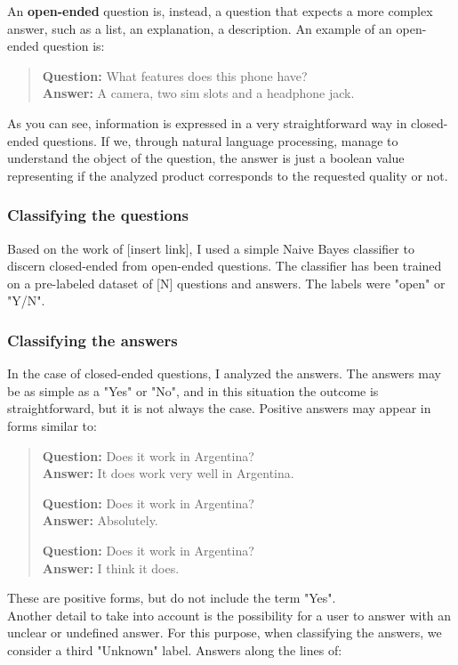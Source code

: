 \documentclass[LaM,binding=0.6cm]{sapthesis}
\begin{document}
An \textbf{open-ended} question is, instead, a question that expects a more complex answer, such as a list, an explanation, a description. An example of an open-ended question is:
\begin{quote}
\textbf{Question:} What features does this phone have? \\
\textbf{Answer:} A camera, two sim slots and a headphone jack.
\end{quote}

As you can see, information is expressed in a very straightforward way in closed-ended questions. If we, through natural language processing, manage to understand the object of the question, the answer is just a boolean value representing if the analyzed product corresponds to the requested quality or not.

\subsubsection{Classifying the questions}
Based on the work of [insert link], I used a simple Naive Bayes classifier to discern closed-ended from open-ended questions.
The classifier has been trained on a pre-labeled dataset of [N] questions and answers. The labels were "open" or "Y/N".

\subsubsection{Classifying the answers}
In the case of closed-ended questions, I analyzed the answers.
The answers may be as simple as a "Yes" or "No", and in this situation the outcome is straightforward, but it is not always the case.
Positive answers may appear in forms similar to:
\begin{quote}
\textbf{Question:} Does it work in Argentina? \\
\textbf{Answer:} It does work very well in Argentina.

\textbf{Question:} Does it work in Argentina? \\
\textbf{Answer:} Absolutely.

\textbf{Question:} Does it work in Argentina? \\
\textbf{Answer:} I think it does.
\end{quote}
These are positive forms, but do not include the term "Yes". \\

Another detail to take into account is the possibility for a user to answer with an unclear or undefined answer. For this purpose, when classifying the answers, we consider a third "Unknown" label.
Answers along the lines of:
\end{document}
